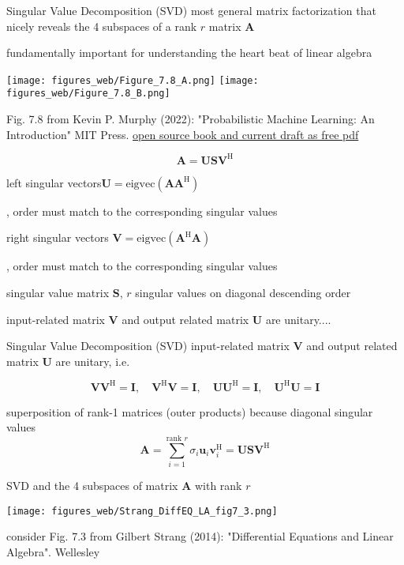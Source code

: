 \documentclass[mathserif, aspectratio=43]{intbeamer}
\begin{document}
\begin{frame}{Singular Value Decomposition (SVD)}
most general matrix factorization that nicely reveals the 4 subspaces of a rank $r$ matrix $\bm{A}$

fundamentally important for understanding the heart beat of linear algebra

\texttt{[image: figures\_web/Figure\_7.8\_A.png]}
\texttt{[image: figures\_web/Figure\_7.8\_B.png]}

\begin{footnotesize}Fig. 7.8 from Kevin P. Murphy (2022): "Probabilistic Machine Learning: An Introduction" MIT Press. \href{https://probml.github.io/pml-book/book1.html}{open source book and current draft as free pdf}\end{footnotesize}

$$\bm{A} = \bm{U} \bm{S} \bm{V}^\mathrm{H}$$

left singular vectors\quad$\bm{U} = \mathrm{eigvec}(\bm{A}\bm{A}^\mathrm{H})$
\begin{footnotesize}, order must match to the corresponding singular values\end{footnotesize}

right singular vectors $\bm{V} = \mathrm{eigvec}(\bm{A}^\mathrm{H}\bm{A})$
\begin{footnotesize}, order must match to the corresponding singular values\end{footnotesize}

singular value matrix $\bm{S}$, $r$ singular values on diagonal descending order

input-related matrix $\bm{V}$ and output related matrix $\bm{U}$ are unitary....


\end{frame}


\begin{frame}{Singular Value Decomposition (SVD)}
input-related matrix $\bm{V}$ and output related matrix $\bm{U}$ are unitary, i.e.

$$\bm{V}\bm{V}^\mathrm{H}=\bm{I},\quad\bm{V}^\mathrm{H}\bm{V}=\bm{I},\quad\bm{U}\bm{U}^\mathrm{H}=\bm{I},\quad\bm{U}^\mathrm{H}\bm{U}=\bm{I}$$

superposition of rank-1 matrices (outer products) because diagonal singular values
$$\bm{A} = \sum_{i=1}^{\text{rank }r} \sigma_i \bm{u}_i \bm{v}_i^\mathrm{H} = \bm{U} \bm{S} \bm{V}^\mathrm{H}$$

SVD and the 4 subspaces of matrix $\bm{A}$ with rank $r$
\begin{center}
\texttt{[image: figures\_web/Strang\_DiffEQ\_LA\_fig7\_3.png]}
\end{center}
\begin{footnotesize}consider Fig. 7.3 from Gilbert Strang (2014): "Differential Equations and Linear Algebra". Wellesley\end{footnotesize}

\end{frame}
\end{document}
